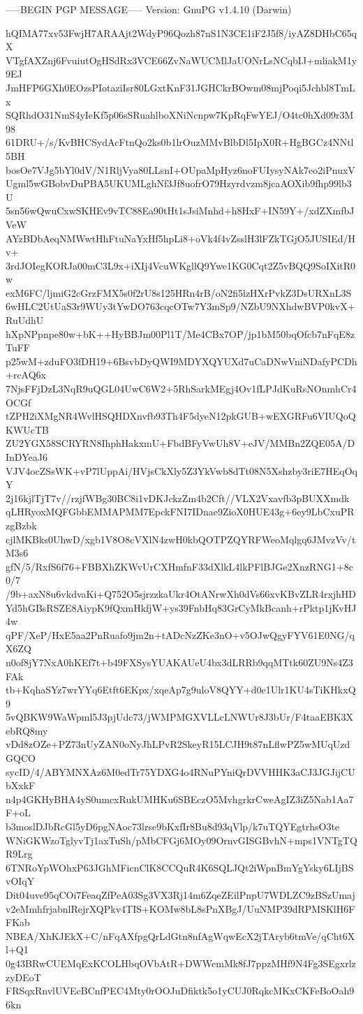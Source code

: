 -----BEGIN PGP MESSAGE-----
Version: GnuPG v1.4.10 (Darwin)

hQIMA77xv53FwjH7ARAAjt2WdyP96Qozh87nS1N3CE1iF2J5f8/iyAZ8DHbC65qX
VTgfAXZnj6FvuiutOgHSdRx3VCE66ZvNaWUCMlJaUONrLsNCqbIJ+mliakM1y9EJ
JmHFP6GXh0EOzsPIotaziIsr80LGxtKnF31JGHCkrBOwm08mjPoqi5Jchbl8TmLx
SQRhdO31NmS4yIeKf5p06sSRuahlboXNiNcnpw7KpRqFwYEJ/O4tc0hXd09r3M98
61DRU+/s/KvBHCSydAcFtnQo2ks0b1lrOuzMMvBlbDl5IpX0R+HgBGCz4NNtl5BH
bosOe7VJg5bYl0dV/N1RljVya80LLsnI+OUpaMpHyz6noFUIysyNAk7eo2iPnuxV
Ugml5wGBobvDuPBA5UKUMLghNf3Jf8uofrO79Hzyrdvzm8jcaAOXib9fhp99lb3U
5sn56wQwuCxwSKHEv9vTC88Ea90tHt1sJsiMnhd+h8HxF+IN59Y+/xdZXmfbJVeW
AYzBDbAeqNMWwtHhFtuNaYxHf5hpLi8+oVk4f4vZsslH3lFZkTGjO5JUSIEd/Hv+
3rdJOIegKORJa00mC3L9x+iXIj4VcuWKgllQ9Ywe1KG0Cqt2Z5vBQQ9SoIXitR0w
exM6FC/ljmiG2cGrzFMX5s0f2rU8s125HRn4rB/oN2fi5lzHXrPvkZ3DsURXnL3S
6wHLC2UtUaS3r9WUy3tYwDO763cqcOTw7Y3mSp9/NZbU9NXhdwBVP0kvX+RuUdhU
hXpNPpnpe80w+bK++HyBBJm00Pl1T/Me4CBx7OP/jp1bM50bqOfcb7nFqE8zTuFF
p25wM+zduFO3fDH19+6BsvbDyQWI9MDYXQYUXd7uCaDNwVniNDafyPCDh+rcAQ6x
7NjsFFjDzL3NqR9uQGL04UwC6W2+5RhSarkMEgj4Ov1fLPJdKuRsNOnmhCr4OCGf
tZPH2iXMgNR4WvlHSQHDXnvfb93Th4F5dyeN12pkGUB+wEXGRFu6VIUQoQKWUcTB
ZU2YGX58SCRYRN8IhphHakxmU+FbdBFyVwUh8V+eJV/MMBn2ZQE05A/DInDYeaJ6
VJV4ocZSsWK+vP7lUppAi/HVjsCkXly5Z3YkVwb8dTt08N5Xshzby3riE7HEqOqY
2j16kjlTjT7v//rzjfWBg30BC8i1vDKJckzZm4b2Cft//VLX2Vxavfb3pBUXXmdk
qLHRyoxMQFGbbEMMAPMM7EpckFNI7IDnae9ZioX0HUE43g+6ey9LbCxuPRzgBzbk
cjlMKBks0UhwD/xgb1V8O8cVXlN4zwH0kbQOTPZQYRFWeoMqlgq6JMvzVv/tM3s6
gfN/5/RxfS6f76+FBBXhZKWvUrCXHmfnF33dXlkL4lkPFlBJGe2XnzRNG1+8c0/7
/9b+axN8u6vkdvaKi+Q752O5sjrzzkaUkr4OtANrwXh0dVs66xvKBvZLR4rxjhHD
Yd5hGBsRSZE8AiypK9fQxmHkfjW+ys39FnbHq83GrCyMkBcanh+rPktp1jKvHJ4w
qPF/XeP/HxE5aa2PnRuafo9jm2n+tADcNzZKe3nO+v5OJwQgyFYV61E0NG/qX6ZQ
n0of8jY7NxA0hKEf7t+b49FXSysYUAKAUeU4bx3dLRRb9qqMTtk60ZU9Ns4Z3FAk
tb+KqhaSYz7wrYYq6Etft6EKpx/xqeAp7g9uloV8QYY+d0e1Ulr1KU4sTiKHkxQ9
5vQBKW9WaWpml5J3pjUdc73/jWMPMGXVLLcLNWUr8J3bUr/F4taaEBK3XebRQ8my
vDd8zOZe+PZ73nUyZAN0oNyJhLPvR2SkeyR15LCJH9t87nLflwPZ5wMUqUzdGQCO
sycID/4/ABYMNXAz6M0edTr75YDXG4o4RNuPYniQrDVVHHK3aCJ3JGJijCUbXxkF
n4p4GKHyBHA4yS0umcxRukUMHKu6SBEczO5MvhgrkrCweAgIZ3iZ5Nab1Aa7F+oL
b3moslDJbRcGl5yD6pgNAoc73lrse9bKxfIr8Bu8d93qVlp/k7uTQYEgtrhsO3te
WNiGKWzoTglyvTj1axTuSh/pMbCFGj6MOy09OrnvGISGBvhN+mps1VNTgTQR9Lrg
6TNRoYpWOhxP63JGhMFicnClK8CCQuR4K6SQLJQt2iWpnBmYgYsky6LIjBSvOIqY
Dit04uve95qCOi7FeaqZfPeA03Sg3VX3Rj14m6ZqeZEilPnpU7WDLZC9zBSzUmaj
v2eMmhfrjabnlRejrXQPkv4TIS+KOMw8bL8sPnXBgJ/UuNMP39dRPMSKlH6FFKab
NBEA/XhKJEkX+C/nFqAXfpgQrLdGtn8nfAgWqwEcX2jTAryb6tmVe/qCht6Xl+Q1
0g43BRwCUEMqExKCOLHbqOVbAtR+DWWcmMk8fJ7ppzMHf9N4Fg3SEgxrlzzyDEoT
FRSqxRnvlUVEcBCnfPEC4Mty0rOOJuDfiktk5o1yCUJ0RqkcMKxCKFeBoOah96kn
